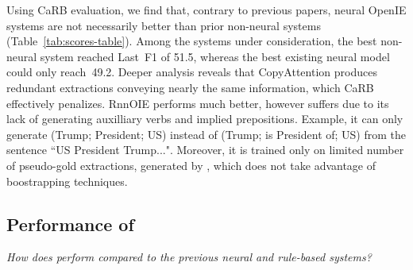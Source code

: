         Using CaRB evaluation, we find that, contrary to previous papers, neural OpenIE systems are not necessarily better than prior non-neural systems (Table~\ref{tab:scores-table}).  Among the systems under consideration, the best non-neural system reached Last~F1 of 51.5, whereas the best existing neural model could only reach~49.2. Deeper analysis reveals that CopyAttention produces redundant extractions conveying nearly the same information, which CaRB effectively penalizes.  RnnOIE performs much better, however suffers due to its lack of generating auxilliary verbs and implied prepositions. Example, it can only generate (Trump; President; US) instead of (Trump; is President of; US) from the sentence ``US President Trump...". Moreover, it is trained only on limited number of pseudo-gold extractions, generated by \citet{michael&al18}, which does not take advantage of boostrapping techniques.


        \vspace{0.5ex}
    \subsection{Performance of \shortname}
        \emph{How does \shortname{} perform compared to the previous neural and rule-based systems?} 

